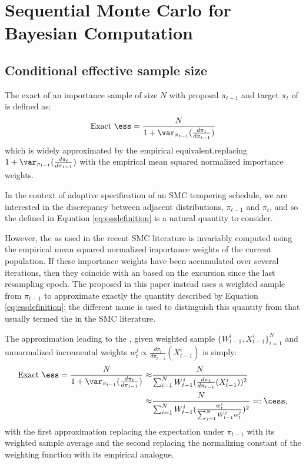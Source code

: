 \chapter{Sequential Monte Carlo for Bayesian Computation}
\label{cha:Sequential Monte Carlo for Bayesian Computation}

\section{Conditional effective sample size}
\label{app:Conditional effective sample size}

The exact \ess of an importance sample of size $N$ with proposal $\pi_{t-1}$
and target $\pi_t$ of \cite{Kong:1994ul} is defined as:
\begin{equation}
  \text{Exact \ess} =
  \frac{N}{1 + \var_{\pi_{t-1}}(\frac{d\pi_t}{d\pi_{t-1}})}
  \label{eq:essdefinition}
\end{equation}
which is widely approximated by the empirical equivalent,replacing
$1+\var_{\pi_{t-1}}(\frac{d\pi_t}{d\pi_{t-1}})$ with the empirical mean squared
normalized importance weights.

In the context of adaptive specification of an SMC tempering schedule, we are
interested in the discrepancy between adjacent distributions, $\pi_{t-1}$ and
$\pi_t$, and so the \ess defined in Equation \ref{eq:essdefinition} is a
natural quantity to consider.

However, the \ess as used in the recent SMC literature is invariably computed
using the empirical mean squared normalized importance weights of the current
population. If these importance weights have been accumulated over several
iterations, then they coincide with an \ess based on the excursion since the
last resampling epoch. The \cess proposed in this paper instead uses a
weighted sample from $\pi_{t-1}$ to approximate exactly the quantity described
by Equation \ref{eq:essdefinition}; the different name is used to distinguish
this quantity from that usually termed the \ess in the SMC literature.

The approximation leading to the \cess, given weighted sample
$\{W_{t-1}^i,X_{t-1}^i\}_{i=1}^N$ and unnormalized incremental weights
$w_{t}^j \propto \frac{d\pi_t}{d\pi_{t-1}}(X_{t-1}^i)$ is simply:
\begin{align*}
\text{Exact \ess} = \frac{N}{1 + \var_{\pi_{t-1}}(\frac{d\pi_t}{d\pi_{t-1}})}
\approx& \frac{N}{\sum_{i=1}^N W_{t-1}^i
  (\frac{d\pi_t}{d\pi_{t-1}}(X_{t-1}^i))^2}\\
\approx& \frac{N}{\sum_{i=1}^N W_{t-1}^i
  (\frac{w_t^i}{\sum_{j=1}^N W_{t-1}^j w_t^j})^2} =: \cess,
\end{align*}
with the first approximation replacing the expectation under $\pi_{t-1}$ with
its weighted sample average and the second replacing the normalizing constant
of the weighting function with its empirical analogue.

